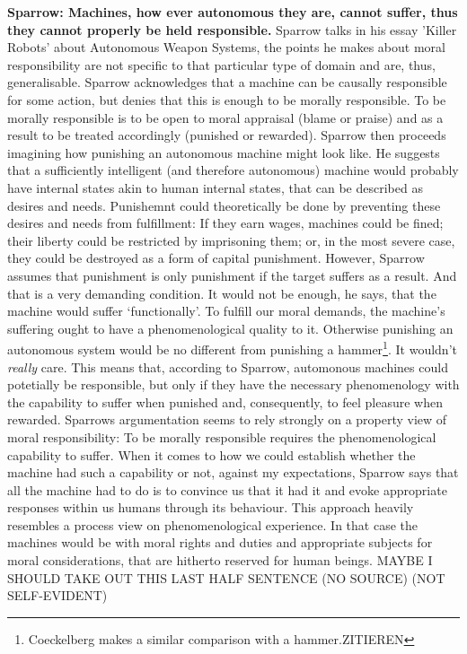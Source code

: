 \documentclass{article}
\begin{document}
\textbf{Sparrow: Machines, how ever autonomous they are, cannot suffer, thus they cannot
properly be held responsible.}
Sparrow talks in his essay 'Killer Robots' about Autonomous Weapon Systems, the
points he makes about moral responsibility are not specific to that particular
type of domain and are, thus, generalisable. Sparrow acknowledges that a machine
can be causally responsible for some action, but denies that this is enough to
be morally responsible. To be morally responsible is to be open to moral appraisal
(blame or praise) and as a result to be treated accordingly (punished or
rewarded). Sparrow then proceeds imagining how punishing an autonomous machine
might look like. He suggests that a sufficiently intelligent (and therefore
autonomous) machine would probably have internal states akin to human internal
states, that can be described as desires and needs. Punishemnt could
theoretically be done by preventing these desires and needs from fulfillment: If
they earn wages, machines could be fined; their liberty could be restricted by
imprisoning them; or, in the most severe case, they could be destroyed as a form
of capital punishment. However, Sparrow assumes that punishment is only
punishment if the target suffers as a result. And that is a very demanding
condition. It would not be enough, he says, that the machine would suffer
`functionally'. To fulfill our moral demands, the machine's suffering ought to
have a phenomenological quality to it. Otherwise punishing an autonomous system
would be no different from punishing a hammer\footnote{Coeckelberg makes a
similar comparison with a hammer.ZITIEREN}. It wouldn't \textit{really} care.
This means that, according to Sparrow, automonous machines could potetially be
responsible, but only if they have the necessary phenomenology with the
capability to suffer when punished and, consequently, to feel pleasure when
rewarded. Sparrows argumentation seems to rely strongly on a property view of moral
responsibility: To be morally responsible requires the phenomenological
capability to suffer. When it comes to how we could establish whether the
machine had such a capability or not, against my expectations, Sparrow says that
all the machine had to do is to convince us that it had it and evoke appropriate
responses within us humans through its behaviour. This approach heavily
resembles a process view on phenomenological experience. In that case the
machines would be  with moral rights and duties and
appropriate subjects for moral considerations, that are hitherto reserved for
human beings. MAYBE I SHOULD TAKE OUT THIS LAST HALF SENTENCE (NO SOURCE) (NOT
SELF-EVIDENT)
\end{document}
